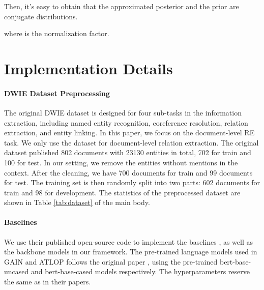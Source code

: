\documentclass[11pt]{article}
\begin{document}
Then, it's easy to obtain that the approximated posterior  and the prior  are conjugate distributions.


where  is the normalization factor.







\section{Implementation Details}
\label{sec:appendix:imp}

\paragraph{DWIE Dataset Preprocessing}
The original DWIE dataset \cite{zaporojets2020dwie} is designed for four sub-tasks in the information extraction, including named entity recognition, coreference resolution, relation extraction, and entity linking. In this paper, we focus on the document-level RE task. We only use the dataset for document-level relation extraction. The original dataset published 802 documents with 23130 entities in total, 702 for train and 100 for test. In our setting, we remove the entities without mentions in the context. After the cleaning, we have 700 documents for train and 99 documents for test. The training set is then randomly split into two parts: 602 documents for train and 98 for development. The statistics of the preprocessed dataset are shown in Table \ref{tab:dataset} of the main body.

\paragraph{Baselines}
We use their published open-source code to implement the baselines \cite{yao-etal-2019-docred, zeng-etal-2020-double, zhou2021atlop}, as well as the backbone models in our framework. The pre-trained language models used in GAIN and ATLOP follows the original paper \cite{zeng-etal-2020-double, zhou2021atlop}, using the pre-trained bert-base-uncased and bert-base-cased models respectively. The hyperparameters reserve the same as in their papers.










 
\end{document}
